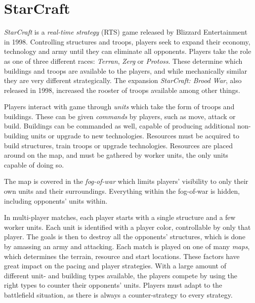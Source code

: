 \chapter{StarCraft}
\label{ch:starcraft}
\emph{StarCraft} is a \emph{real-time strategy} (RTS) game released by Blizzard Entertainment in 1998. Controlling structures and troops, players seek to expand their economy, technology and army until they can eliminate all opponents. Players take the role as one of three different races: \emph{Terran}, \emph{Zerg} or \emph{Protoss}. These determine which buildings and troops are available to the players, and while mechanically similar they are very different strategically. The expansion \emph{StarCraft: Brood War}, also released in 1998, increased the rooster of troops available among other things.

Players interact with game through \emph{units} which take the form of troops and buildings. These can be given \emph{commands} by players, such as move, attack or build. Buildings can be commanded as well, capable of producing additional non-building units or upgrade to new technologies. Resources must be acquired to build structures, train troops or upgrade technologies. Resources are placed around on the map, and must be gathered by worker units, the only units capable of doing so.

The map is covered in the \emph{fog-of-war} which limits players' visibility to only their own units and their surroundings. Everything within the fog-of-war is hidden, including opponents' units within.

In multi-player matches, each player starts with a single structure and a few worker units. Each unit is identified with a player color, controllable by only that player. The goals is then to destroy all the opponents' structures, which is done by amassing an army and attacking. Each match is played on one of many \emph{maps}, which determines the terrain, resource and start locations. These factors have great impact on the pacing and player strategies. With a large amount of different unit- and building types available, the players compete by using the right types to counter their opponents' units. Players must adapt to the battlefield situation, as there is always a counter-strategy to every strategy.